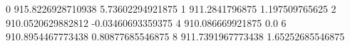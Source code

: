0 915.8226928710938 5.73602294921875
1 911.2841796875 1.197509765625
2 910.0520629882812 -0.03460693359375
4 910.086669921875 0.0
6 910.8954467773438 0.80877685546875
8 911.7391967773438 1.65252685546875
